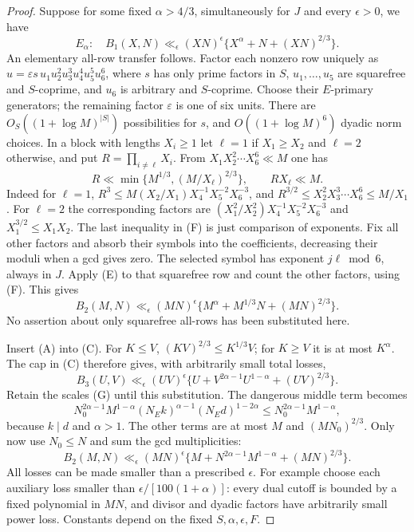 \documentclass[11pt]{article}
\theoremstyle{remark}\newtheorem{remark}[theorem]{Remark}
\begin{document}
\begin{proof}
Suppose for some fixed $\alpha>4/3$, simultaneously for $J$
and every $\epsilon>0$, we have
\[
 E_\alpha:\quad B_1(X,N)\ll_\epsilon(XN)^\epsilon
                   \{X^\alpha+N+(XN)^{2/3}\}.                \tag{E}
\]
An elementary all-row transfer follows. Factor each nonzero row
uniquely as
$u=\varepsilon s\,u_1u_2^2u_3^3u_4^4u_5^5u_6^6$,
where $s$ has only prime factors in $S$,
$u_1,\ldots,u_5$ are squarefree and $S$-coprime,
and $u_6$ is arbitrary and $S$-coprime.
Choose their $E$-primary generators; the remaining factor
$\varepsilon$ is one of six units.
There are $O_S((1+\log M)^{|S|})$ possibilities for $s$,
and $O((1+\log M)^6)$ dyadic norm choices.
In a block with lengths $X_i\ge1$ let
$\ell=1$ if $X_1\ge X_2$ and $\ell=2$ otherwise, and put
$R=\prod_{i\ne\ell}X_i$. From
$X_1X_2^2\cdots X_6^6\ll M$ one has
\[
 R\ll\min\{M^{1/3},(M/X_\ell)^{2/3}\},
 \qquad RX_\ell\ll M.                            \tag{F}
\]
Indeed for $\ell=1$, $R^3\le
M(X_2/X_1)X_4^{-1}X_5^{-2}X_6^{-3}$, and
$R^{3/2}\le X_2^2X_3^3\cdots X_6^6\le M/X_1$.
For $\ell=2$ the corresponding factors are
$(X_1^2/X_2^2)X_4^{-1}X_5^{-2}X_6^{-3}$ and
$X_1^{3/2}\le X_1X_2$.
The last inequality in (F) is just comparison of exponents.
Fix all other factors and absorb their symbols into the
coefficients, decreasing their moduli when a gcd gives zero.
The selected symbol has exponent $j\ell\bmod6$, always in $J$.
Apply (E) to that squarefree row and count the other factors,
using (F). This gives
\[
 B_2(M,N)\ll_\epsilon(MN)^\epsilon
                 \{M^\alpha+M^{1/3}N+(MN)^{2/3}\}.             \tag{A}
\]
No assertion about only squarefree all-rows has been substituted here.

Insert (A) into (C). For $K\le V$,
$(KV)^{2/3}\le K^{1/3}V$; for $K\ge V$ it is at most
$K^\alpha$. The cap in (C) therefore gives, with arbitrarily
small total losses,
\[
 B_3(U,V)\ll_\epsilon(UV)^\epsilon
           \{U+V^{2\alpha-1}U^{1-\alpha}+(UV)^{2/3}\}.
\]
Retain the scales (G) until this substitution.
The dangerous middle term becomes
\[
 N_0^{2\alpha-1}M^{1-\alpha}
       (N_Ek)^{\alpha-1}(N_Ed)^{1-2\alpha}
 \le N_0^{2\alpha-1}M^{1-\alpha},
\]
because $k\mid d$ and $\alpha>1$.
The other terms are at most $M$ and $(MN_0)^{2/3}$.
Only now use $N_0\le N$ and sum the gcd multiplicities:
\[
 B_2(M,N)\ll_\epsilon(MN)^\epsilon
       \{M+N^{2\alpha-1}M^{1-\alpha}+(MN)^{2/3}\}.             \tag{B}
\]
All losses can be made smaller than a prescribed $\epsilon$.
For example choose each auxiliary loss smaller than
$\epsilon/[100(1+\alpha)]$: every dual cutoff is bounded
by a fixed polynomial in $MN$, and divisor and dyadic factors
have arbitrarily small power loss. Constants depend on the
fixed $S,\alpha,\epsilon,F$.


\end{proof}
\end{document}
